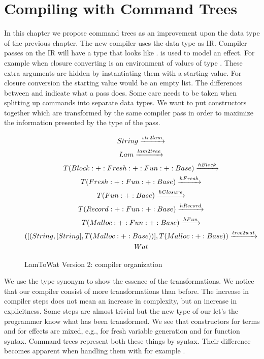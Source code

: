 
\chapter{\label{chap:treecomp}Compiling with Command Trees}

In this chapter we propose command trees as an improvement upon the  data type of the previous chapter. The new compiler uses the  data type as IR. Compiler passes on the IR will have a type that looks like .  is used to model an effect. For example when closure converting  is an environment of values of type . These extra arguments are hidden by instantiating them with a starting value. For closure conversion the starting value would be an empty list. The differences between  and  indicate what a pass does. Some care needs to be taken when splitting up commands into separate data types. We want to put constructors together which are transformed by the same compiler pass in order to maximize the information presented by the type of the pass.

\begin{figure}
\begin{gather*}
  String \xrightarrow{str2lam}\\
  Lam \xrightarrow{lam2tree}\\
  T (Block :+: Fresh :+: Fun :+: Base) \xrightarrow{hBlock}\\
  T           (Fresh :+: Fun :+: Base) \xrightarrow{hFresh}\\
  T                     (Fun :+: Base) \xrightarrow{hClosure}\\
  T          (Record :+: Fun :+: Base) \xrightarrow{hRecord}\\
  T          (Malloc :+: Fun :+: Base) \xrightarrow{hFun}\\
  ([(String,[String],T (Malloc :+: Base))], T (Malloc :+: Base)) \xrightarrow{tree2wat}\\
  Wat
\end{gather*}
\caption{LamToWat Version 2: compiler organization}
\label{fig:lam2watv2org}
\end{figure}

We use the type synonym  to show the essence of the transformations. We notice that our compiler consist of more transformations than before. The increase in compiler steps does not mean an increase in complexity, but an increase in explicitness. Some steps are almost trivial but the new type of our  let's the programmer know what has been transformed. We see that constructors for terms and for effects are mixed, e.g.,  for fresh variable generation and  for function syntax. Command trees represent both these things by syntax. Their difference becomes apparent when handling them with for example .

